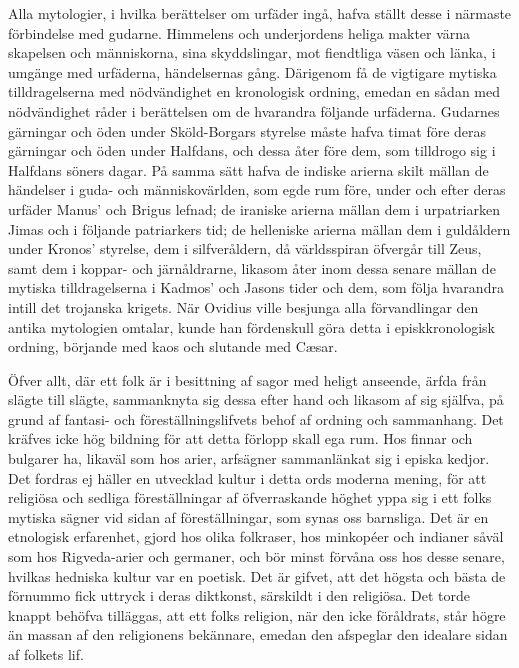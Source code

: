 Alla mytologier, i hvilka berättelser om urfäder ingå, hafva ställt
desse i närmaste förbindelse med gudarne. Himmelens och underjordens
heliga makter värna skapelsen och människorna, sina skyddslingar, mot
fiendtliga väsen och länka, i umgänge med urfäderna, händelsernas gång.
Därigenom få de vigtigare mytiska tilldragelserna med nödvändighet en
kronologisk ordning, emedan en sådan med nödvändighet råder i
berättelsen om de hvarandra följande urfäderna. Gudarnes gärningar och
öden under Sköld-Borgars styrelse måste hafva timat före deras gärningar
och öden under Halfdans, och dessa åter före dem, som tilldrogo sig i
Halfdans söners dagar. På samma sätt hafva de indiske arierna skilt
mällan de händelser i guda- och människovärlden, som egde rum före,
under och efter deras urfäder Manus' och Brigus lefnad; de iraniske
arierna mällan dem i urpatriarken Jimas och i följande patriarkers tid;
de helleniske arierna mällan dem i guldåldern under Kronos' styrelse,
dem i silfveråldern, då världsspiran öfvergår till Zeus, samt dem i
koppar- och järnåldrarne, likasom åter inom dessa senare mällan de
mytiska tilldragelserna i Kadmos' och Jasons tider och dem, som följa
hvarandra intill det trojanska krigets. När Ovidius ville besjunga alla
förvandlingar den antika mytologien omtalar, kunde han fördenskull göra
detta i episkkronologisk ordning, börjande med kaos och slutande med
Cæsar.

\protect\hypertarget{lb1625905.xhtmlux5cux23start1}{}{}\protect\hypertarget{lb1625905.xhtmlux5cux23start1-a}{}{}\protect\hypertarget{lb1625905.xhtmlux5cux23start1-b}{}{}\protect\hypertarget{lb1625905.xhtmlux5cux23start1-c}{}{}\protect\hypertarget{lb1625905.xhtmlux5cux23start1-d}{}{}

Öfver allt, där ett folk är i besittning af sagor med heligt anseende,
ärfda från slägte till slägte, sammanknyta sig dessa efter hand och
likasom af sig själfva, på grund af fantasi- och föreställningslifvets
behof af ordning och sammanhang. Det kräfves icke hög bildning för att
detta förlopp skall ega rum. Hos finnar och bulgarer ha, likaväl som hos
arier, arfsägner sammanlänkat sig i episka kedjor. Det fordras ej häller
en utvecklad kultur i detta ords moderna mening, för att religiösa och
sedliga föreställningar af öfverraskande höghet yppa sig i ett folks
mytiska sägner vid sidan af föreställningar, som synas oss barnsliga.
Det är en etnologisk erfarenhet, gjord hos olika folkraser, hos
minkopéer och indianer såväl som hos Rigveda-arier och germaner, och bör
minst förvåna oss hos desse senare, hvilkas hedniska kultur var en
poetisk. Det är gifvet, att det högsta och bästa de förnummo fick
uttryck i deras diktkonst, särskildt i den religiösa. Det torde knappt
behöfva tilläggas, att ett folks religion, när den icke föråldrats, står
högre än massan af den religionens bekännare, emedan den afspeglar den
idealare sidan af folkets lif.

